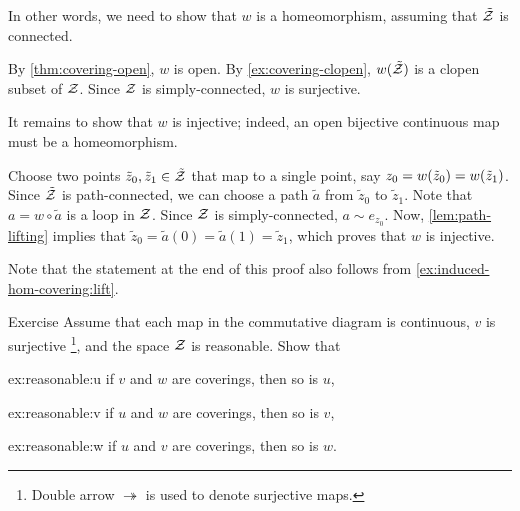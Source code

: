 In other words, we need to show that $w$ is a homeomorphism, assuming that $\tilde{\mathcal{Z}}$ is connected.

By \ref{thm:covering-open}, $w$ is open.
By \ref{ex:covering-clopen}, $w(\tilde{\mathcal{Z}})$ is a clopen subset of $\mathcal{Z}$.
Since $\mathcal{Z}$ is simply-connected, $w$ is surjective.

It remains to show that $w$ is injective;
indeed, an open bijective continuous map must be a homeomorphism.

Choose two points $\tilde z_0,\tilde z_1\in\tilde{\mathcal{Z}}$ that map to a single point, say $z_0\z=w(\tilde z_0)=w(\tilde z_1)$.
Since $\tilde{\mathcal{Z}}$ is path-connected, we can choose a path $\tilde a$ from $\tilde z_0$ to $\tilde z_1$.
Note that $a=w\circ \tilde a$ is a loop in $\mathcal{Z}$.
Since $\mathcal{Z}$ is simply-connected, $a\sim e_{z_0}$.
Now, \ref{lem:path-lifting} implies that $\tilde z_0=\tilde a(0)=\tilde a(1)=\tilde z_1$, which proves that $w$ is injective.
\qeds

Note that the statement at the end of this proof also follows from \ref{ex:induced-hom-covering:lift}.

{

\begin{figure}
\vskip-2mm
\centering
{}
\end{figure}

\begin{thm}[!]{Exercise}\label{ex:reasonable-diagram}
Assume that each map in the commutative diagram is continuous, $v$ is surjective%
\footnote{Double arrow $\twoheadrightarrow$ is used to denote surjective maps.}, and the space $\mathcal{Z}$ is reasonable.
Show that
\begin{subthm}{ex:reasonable:u}
if $v$ and $w$ are coverings, then so is $u$,
\end{subthm}

\begin{subthm}{ex:reasonable:v}
if $u$ and $w$ are coverings, then so is $v$,
\end{subthm}

\begin{subthm}{ex:reasonable:w}
if $u$ and $v$ are coverings, then so is $w$.
\end{subthm}

\end{thm}

}

